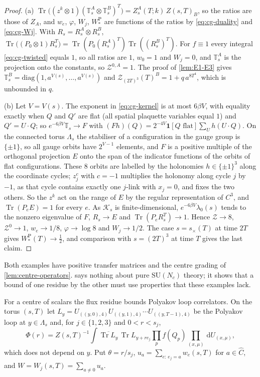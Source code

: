 \documentclass[11pt,a4paper]{amsart}
\theoremstyle{definition}
\theoremstyle{remark}
\numberwithin{equation}{section}
\DeclareMathOperator{\Tr}{Tr}        %
\newcommand{\Kspace}{\mathcal{K}}    %
\newcommand{\dd}{\,\mathrm{d}}             %
\newcommand{\SU}{\mathrm{SU}}              %
\newcommand{\TT}{\mathbb{T}}               %
\newcommand{\Zpart}[2]{Z(#1,#2)}           %
\newcommand{\Zc}{\mathcal{Z}}              %
\newcommand{\Zs}[2]{\Zc_{#1}(#2)}          %
\newcommand{\Vol}[1]{V(#1)}                %
\newcommand{\cube}[1]{(2#1)^3}             %
\newcommand{\lzero}{\lambda_0}             %
\begin{document}
\begin{proof}
(a) $\Tr\bigl((z^k\otimes1)(\TT^A_s\otimes\TT^B_s)^T\bigr)=Z^A_s(T;k)\,\Zpart{s}{T}_B$, so the ratios are those of $Z_A$, and $w_e$, $\varphi$, $W_j$, $W^{\mathrm P}_*$ are functions of the ratios by \eqref{eq:cg-duality} and \eqref{eq:cg-Wj}. With $R_s=R^A_s\otimes R^B_s$, $\Tr\bigl((P_0\otimes1)R_s^T\bigr)=\Tr(P_0(R^A_s)^T)\Tr((R^B_s)^T)$. For $f\equiv1$ every integral \eqref{eq:cg-twisted} equals $1$, so all ratios are $1$, $w_0=1$ and $W_j=0$, and $\TT^A_s$ is the projection onto the constants, so $\Zc^{0,A}=1$. The proof of \cref{lem:E1-E3} gives $\TT^B_s=\mathrm{diag}(1,a^{\Vol{s}},\dots,a^{\Vol{s}})$ and $\Zs{\cube T}{T}^B=1+q\,a^{8T^4}$, which is unbounded in $q$.

(b) Let $V=\Vol{s}$. The exponent in \eqref{eq:cg-kernel} is at most $6\beta V$, with equality exactly when $Q$ and $Q'$ are flat (all spatial plaquette variables equal $1$) and $Q'=U\cdot Q$; so $e^{-6\beta V}\TT_s\to F$ with $(Fh)(Q)=2^{-4V}\mathbf 1[Q\text{ flat}]\sum_Uh(U\cdot Q)$. On the connected torus $\Lambda_s$ the stabiliser of a configuration in the gauge group is $\{\pm1\}$, so all gauge orbits have $2^{V-1}$ elements, and $F$ is a positive multiple of the orthogonal projection $E$ onto the span of the indicator functions of the orbits of flat configurations. These $8$ orbits are labelled by the holonomies $h\in\{\pm1\}^3$ along the coordinate cycles; $z_j^{c}$ with $c=-1$ multiplies the holonomy along cycle $j$ by $-1$, as that cycle contains exactly one $j$-link with $x_j=0$, and fixes the two others. So the $z^k$ act on the range of $E$ by the regular representation of $C^3$, and $\Tr(P_eE)=1$ for every $e$. As $\Kspace_s$ is finite-dimensional, $e^{-6\beta V}\lzero(s)$ tends to the nonzero eigenvalue of $F$, $R_s\to E$ and $\Tr(P_eR_s^T)\to1$. Hence $\Zc\to8$, $\Zc^0\to1$, $w_e\to1/8$, $\varphi\to\log8$ and $W_j\to1/2$. The case $s=s_\times(T)$ at time $2T$ gives $W^{\mathrm P}_*(T)\to\frac12$, and comparison with $s=\cube T$ at time $T$ gives the last claim.
\end{proof}

Both examples have positive transfer matrices and the centre grading of \cref{lem:centre-operators}.  says nothing about pure $\SU(N_c)$ theory; it shows that a bound of one residue by the other must use properties that these examples lack.

For a centre of scalars the flux residue bounds Polyakov loop correlators. On the torus $(s,T)$ let $L_y=U_{((y,0),4)}U_{((y,1),4)}\cdots U_{((y,T-1),4)}$ be the Polyakov loop at $y\in\Lambda_s$ and, for $j\in\{1,2,3\}$ and $0<r<s_j$,
\[
\Phi(r)=\Zpart{s}{T}^{-1}\int\overline{\Tr L_y}\,\Tr L_{y+re_j}\prod_pf(Q_p)\prod_{(x,\mu)}\dd U_{(x,\mu)},
\]
which does not depend on $y$. Put $\theta=r/s_j$, $u_a=\sum_{e:\,e_j=a}w_e(s,T)$ for $a\in\widehat C$, and $W=W_j(s,T)=\sum_{a\ne0}u_a$.
\end{document}
